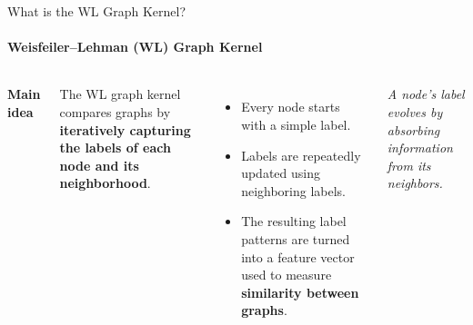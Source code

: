 \documentclass[aspectratio=169, 11pt]{beamer}
\begin{document}
\begin{frame}{What is the WL Graph Kernel?}
    \framesubtitle{Weisfeiler--Lehman (WL) Graph Kernel}
    \begin{columns}[c]
        \textbf{Main idea}
        \vspace{0.15cm}

        The WL graph kernel compares graphs by \textbf{iteratively capturing the
        labels of each node and its neighborhood}.

        \vspace{0.3cm}
        \begin{itemize}
            \item Every node starts with a simple label.
            \item Labels are repeatedly updated using neighboring labels.
            \item The resulting label patterns are turned into a
            feature vector used to measure \textbf{similarity between graphs}.
        \end{itemize}

        \centering

        \vspace{0.1cm}
        {\scriptsize\itshape A node's label evolves by absorbing
        information from its neighbors.}
    \end{columns}
\end{frame}
\end{document}
